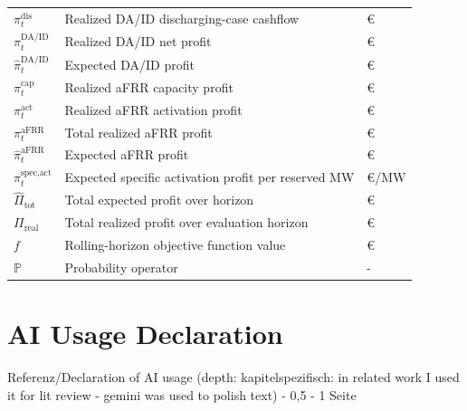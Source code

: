 \begin{longtable}{@{}>{\raggedright\arraybackslash}p{} >{\raggedright\arraybackslash}p{} >{\raggedright\arraybackslash}p{}@{}}
    $\pi_t^{\text{dis}}$                      & Realized DA/ID discharging-case cashflow                                             & €             \\
    $\pi_t^{\text{DA/ID}}$                    & Realized DA/ID net profit                                                            & €             \\
    $\hat{\pi}_t^{\text{DA/ID}}$              & Expected DA/ID profit                                                                & €             \\
    $\pi_t^{\text{cap}}$                      & Realized aFRR capacity profit                                                        & €             \\
    $\pi_t^{\text{act}}$                      & Realized aFRR activation profit                                                      & €             \\
    $\pi_t^{\text{aFRR}}$                     & Total realized aFRR profit                                                           & €             \\
    $\hat{\pi}_t^{\text{aFRR}}$               & Expected aFRR profit                                                                 & €             \\
    $\pi_t^{\text{spec,act}}$                 & Expected specific activation profit per reserved MW                                  & €/MW          \\
    $\hat{\Pi}_{\text{tot}}$                  & Total expected profit over horizon                                                   & €             \\
    $\Pi_{\text{real}}$                       & Total realized profit over evaluation horizon                                        & €             \\
    $f$                                       & Rolling-horizon objective function value                                             & €             \\
    $\mathbb{P}$                              & Probability operator                                                                 & -             \\
\end{longtable}

\section{AI Usage Declaration}\label{sec:app-ai-usage}
Referenz/Declaration of AI usage (depth: kapitelspezifisch: in related work I used it for lit review - gemini was used to polish text) - 0,5 - 1 Seite

